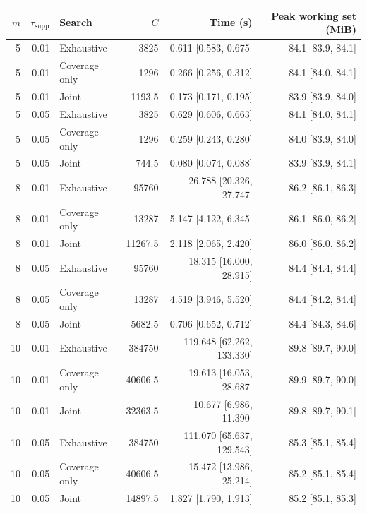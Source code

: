 \begin{table}
\label{tab:computational-scale}
\begin{tabular}{rrlrrr}
\toprule
$m$ & $\tau_{\mathrm{supp}}$ & Search & $C$ & Time (s) & Peak working set (MiB) \\
\midrule
5 & 0.01 & Exhaustive & 3825 & 0.611 [0.583, 0.675] & 84.1 [83.9, 84.1] \\
5 & 0.01 & Coverage only & 1296 & 0.266 [0.256, 0.312] & 84.1 [84.0, 84.1] \\
5 & 0.01 & Joint & 1193.5 & 0.173 [0.171, 0.195] & 83.9 [83.9, 84.0] \\
5 & 0.05 & Exhaustive & 3825 & 0.629 [0.606, 0.663] & 84.1 [84.0, 84.1] \\
5 & 0.05 & Coverage only & 1296 & 0.259 [0.243, 0.280] & 84.0 [83.9, 84.0] \\
5 & 0.05 & Joint & 744.5 & 0.080 [0.074, 0.088] & 83.9 [83.9, 84.1] \\
8 & 0.01 & Exhaustive & 95760 & 26.788 [20.326, 27.747] & 86.2 [86.1, 86.3] \\
8 & 0.01 & Coverage only & 13287 & 5.147 [4.122, 6.345] & 86.1 [86.0, 86.2] \\
8 & 0.01 & Joint & 11267.5 & 2.118 [2.065, 2.420] & 86.0 [86.0, 86.2] \\
8 & 0.05 & Exhaustive & 95760 & 18.315 [16.000, 28.915] & 84.4 [84.4, 84.4] \\
8 & 0.05 & Coverage only & 13287 & 4.519 [3.946, 5.520] & 84.4 [84.2, 84.4] \\
8 & 0.05 & Joint & 5682.5 & 0.706 [0.652, 0.712] & 84.4 [84.3, 84.6] \\
10 & 0.01 & Exhaustive & 384750 & 119.648 [62.262, 133.330] & 89.8 [89.7, 90.0] \\
10 & 0.01 & Coverage only & 40606.5 & 19.613 [16.053, 28.687] & 89.9 [89.7, 90.0] \\
10 & 0.01 & Joint & 32363.5 & 10.677 [6.986, 11.390] & 89.8 [89.7, 90.1] \\
10 & 0.05 & Exhaustive & 384750 & 111.070 [65.637, 129.543] & 85.3 [85.1, 85.4] \\
10 & 0.05 & Coverage only & 40606.5 & 15.472 [13.986, 25.214] & 85.2 [85.1, 85.4] \\
10 & 0.05 & Joint & 14897.5 & 1.827 [1.790, 1.913] & 85.2 [85.1, 85.3] \\
\bottomrule
\end{tabular}
\end{table}

